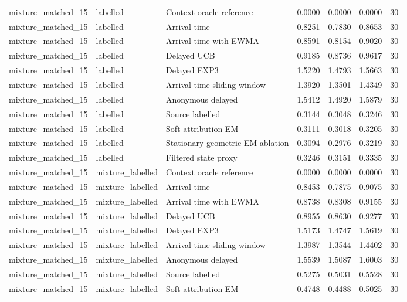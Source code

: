 \begin{tabular}{llllllr}
mixture\_matched\_15 & labelled & Context oracle reference & 0.0000 & 0.0000 & 0.0000 & 30 \\
mixture\_matched\_15 & labelled & Arrival time & 0.8251 & 0.7830 & 0.8653 & 30 \\
mixture\_matched\_15 & labelled & Arrival time with EWMA & 0.8591 & 0.8154 & 0.9020 & 30 \\
mixture\_matched\_15 & labelled & Delayed UCB & 0.9185 & 0.8736 & 0.9617 & 30 \\
mixture\_matched\_15 & labelled & Delayed EXP3 & 1.5220 & 1.4793 & 1.5663 & 30 \\
mixture\_matched\_15 & labelled & Arrival time sliding window & 1.3920 & 1.3501 & 1.4349 & 30 \\
mixture\_matched\_15 & labelled & Anonymous delayed & 1.5412 & 1.4920 & 1.5879 & 30 \\
mixture\_matched\_15 & labelled & Source labelled & 0.3144 & 0.3048 & 0.3246 & 30 \\
mixture\_matched\_15 & labelled & Soft attribution EM & 0.3111 & 0.3018 & 0.3205 & 30 \\
mixture\_matched\_15 & labelled & Stationary geometric EM ablation & 0.3094 & 0.2976 & 0.3219 & 30 \\
mixture\_matched\_15 & labelled & Filtered state proxy & 0.3246 & 0.3151 & 0.3335 & 30 \\
mixture\_matched\_15 & mixture\_labelled & Context oracle reference & 0.0000 & 0.0000 & 0.0000 & 30 \\
mixture\_matched\_15 & mixture\_labelled & Arrival time & 0.8453 & 0.7875 & 0.9075 & 30 \\
mixture\_matched\_15 & mixture\_labelled & Arrival time with EWMA & 0.8738 & 0.8308 & 0.9155 & 30 \\
mixture\_matched\_15 & mixture\_labelled & Delayed UCB & 0.8955 & 0.8630 & 0.9277 & 30 \\
mixture\_matched\_15 & mixture\_labelled & Delayed EXP3 & 1.5173 & 1.4747 & 1.5619 & 30 \\
mixture\_matched\_15 & mixture\_labelled & Arrival time sliding window & 1.3987 & 1.3544 & 1.4402 & 30 \\
mixture\_matched\_15 & mixture\_labelled & Anonymous delayed & 1.5539 & 1.5087 & 1.6003 & 30 \\
mixture\_matched\_15 & mixture\_labelled & Source labelled & 0.5275 & 0.5031 & 0.5528 & 30 \\
mixture\_matched\_15 & mixture\_labelled & Soft attribution EM & 0.4748 & 0.4488 & 0.5025 & 30 \\

\end{tabular}
